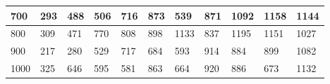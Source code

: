 \documentclass[10pt,letterpaper]{article}
\begin{document}
\begin{center}
\begin{table}
\begin{tabular} { |m{0.5cm}|m{1.3cm}|m{1.3cm}|m{1.3cm}|m{1.3cm}|m{1.3cm}|m{1.3cm}|m{1.3cm}|m{1.3cm}|m{1.3cm}|m{1.3cm}|}
\hline
\cellcolor{Gray}700 & \Large 293 & \Large 488 & \Large 506 & \Large 716 & \Large 873 & \Large 539 & \Large 871 & \Large 1092 & \Large 1158 & \Large 1144 \\
\hline
\cellcolor{Gray}800 & \Large 309 & \Large 471 & \Large 770 & \Large 808 & \Large 898 & \Large 1133 & \Large 837 & \Large 1195 & \Large 1151 & \Large 1027 \\
\hline
\cellcolor{Gray}900 & \Large 217 & \Large 280 & \Large 529 & \Large 717 & \Large 684 & \Large 593 & \Large 914 & \Large 884 & \Large 899 & \Large 1082 \\
\hline
\cellcolor{Gray}1000 & \Large 325 & \Large 646 & \Large 595 & \Large 581 & \Large 863 & \Large 664 & \Large 920 & \Large 886 & \Large 673 & \Large 1132 \\
\hline
\end{tabular} \\
\end{table}
\end{center}
\newpage 
{}
\end{document}
